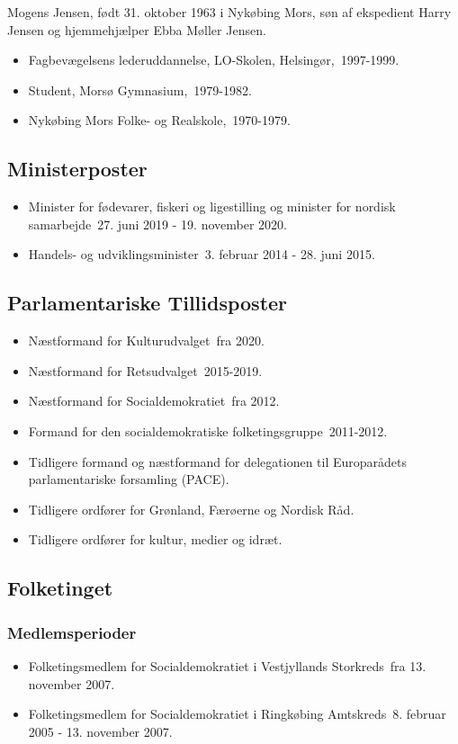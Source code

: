 \documentclass[11pt, a4paper]{awesome-cv}
\begin{document}
\makecvheader[R]
\makelettertitle
\begin{cvletter}
Mogens Jensen, født 31. oktober 1963 i Nykøbing Mors, søn af ekspedient Harry Jensen og hjemmehjælper Ebba Møller Jensen.

\begin{itemize}
\item Fagbevægelsens lederuddannelse, LO-Skolen, Helsingør, 1997-1999.
\item Student, Morsø Gymnasium, 1979-1982.
\item Nykøbing Mors Folke- og Realskole, 1970-1979.
\end{itemize}
\subsection*{Ministerposter}
\begin{itemize}
\item Minister for fødevarer, fiskeri og ligestilling og minister for nordisk samarbejde 27. juni 2019 - 19. november 2020.
\item Handels- og udviklingsminister 3. februar 2014 - 28. juni 2015.
\end{itemize}
\subsection*{Parlamentariske Tillidsposter}
\begin{itemize}
\item Næstformand for Kulturudvalget fra 2020.
\item Næstformand for Retsudvalget 2015-2019.
\item Næstformand for Socialdemokratiet fra 2012.
\item Formand for den socialdemokratiske folketingsgruppe 2011-2012.
\item Tidligere formand og næstformand for delegationen til Europarådets parlamentariske forsamling (PACE).
\item Tidligere ordfører for Grønland, Færøerne og Nordisk Råd.
\item Tidligere ordfører for kultur, medier og idræt.
\end{itemize}
\subsection*{Folketinget}
\subsubsection*{Medlemsperioder}
\begin{itemize}
\item Folketingsmedlem for Socialdemokratiet i Vestjyllands Storkreds fra 13. november 2007.
\item Folketingsmedlem for Socialdemokratiet i Ringkøbing Amtskreds 8. februar 2005 - 13. november 2007.
\end{itemize}

\end{cvletter}
\end{document}
